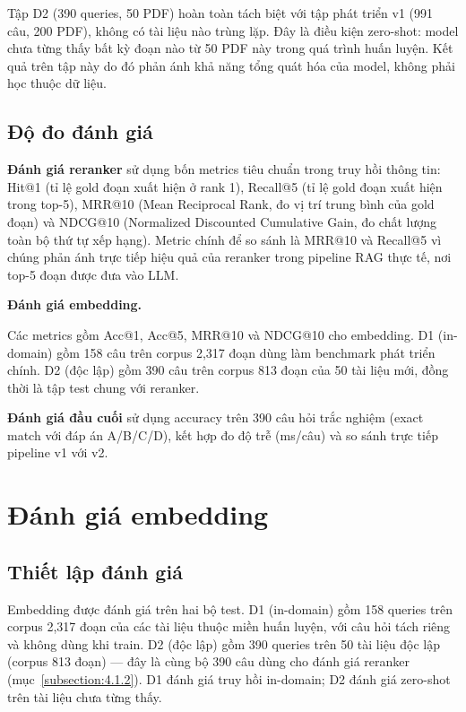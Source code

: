 \documentclass[../DoAn.tex]{subfiles}
\begin{document}
Tập D2 (390 queries, 50 PDF) hoàn toàn tách biệt với tập phát triển v1 (991 câu, 200 PDF), không có tài liệu nào trùng lặp. Đây là điều kiện zero-shot: model chưa từng thấy bất kỳ đoạn nào từ 50 PDF này trong quá trình huấn luyện. Kết quả trên tập này do đó phản ánh khả năng tổng quát hóa của model, không phải học thuộc dữ liệu.

\subsection{Độ đo đánh giá}
\label{subsection:4.1.3}

\textbf{Đánh giá reranker} sử dụng bốn metrics tiêu chuẩn trong truy hồi thông tin: Hit@1 (tỉ lệ gold đoạn xuất hiện ở rank 1), Recall@5 (tỉ lệ gold đoạn xuất hiện trong top-5), MRR@10 (Mean Reciprocal Rank, đo vị trí trung bình của gold đoạn) và NDCG@10 (Normalized Discounted Cumulative Gain, đo chất lượng toàn bộ thứ tự xếp hạng). Metric chính để so sánh là MRR@10 và Recall@5 vì chúng phản ánh trực tiếp hiệu quả của reranker trong pipeline RAG thực tế, nơi top-5 đoạn được đưa vào LLM.

\noindent\textbf{Đánh giá embedding.}

Các metrics gồm Acc@1, Acc@5, MRR@10 và NDCG@10 cho embedding. D1 (in-domain) gồm 158 câu trên corpus 2,317 đoạn dùng làm benchmark phát triển chính. D2 (độc lập) gồm 390 câu trên corpus 813 đoạn của 50 tài liệu mới, đồng thời là tập test chung với reranker.

\textbf{Đánh giá đầu cuối} sử dụng accuracy trên 390 câu hỏi trắc nghiệm (exact match với đáp án A/B/C/D), kết hợp đo độ trễ (ms/câu) và so sánh trực tiếp pipeline v1 với v2.

\section{Đánh giá embedding}
\label{section:embedding-eval}

\subsection{Thiết lập đánh giá}
\label{subsection:4.3.1}

Embedding được đánh giá trên hai bộ test. D1 (in-domain) gồm 158 queries trên corpus 2,317 đoạn của các tài liệu thuộc miền huấn luyện, với câu hỏi tách riêng và không dùng khi train. D2 (độc lập) gồm 390 queries trên 50 tài liệu độc lập (corpus 813 đoạn) --- đây là cùng bộ 390 câu dùng cho đánh giá reranker (mục~\ref{subsection:4.1.2}). D1 đánh giá truy hồi in-domain; D2 đánh giá zero-shot trên tài liệu chưa từng thấy.
\end{document}
